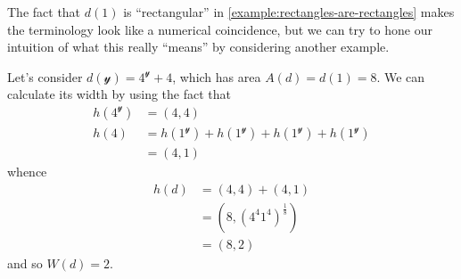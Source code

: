 \documentclass[11pt,fleqn]{article}
\newcommand{\yon}{\mathcal{y}}
\begin{document}
\begin{example}
\label{example:width-and-equal-distribution}
  The fact that $d(1)$ is ``rectangular'' in \cref{example:rectangles-are-rectangles} makes the terminology look like a numerical coincidence, but we can try to hone our intuition of what this really ``means'' by considering another example.

  Let's consider $d(\yon)=4^\yon+4$, which has area $A(d)=d(1)=8$.
  We can calculate its width by using the fact that
  \[
    \begin{aligned}
      h(4^\yon)
      &= (4,4)
    \\h(4)
      &= h(1^\yon) + h(1^\yon) + h(1^\yon) + h(1^\yon)
    \\&= (4,1)
    \end{aligned}
  \]
  whence
  \[
    \begin{aligned}
      h(d)
      &= (4,4) + (4,1)
    \\&= \left(8,(4^4 1^4)^{\frac{1}{8}}\right)
    \\&= (8,2)
    \end{aligned}
  \]
  and so $W(d) = 2$.

  \medskip


\end{example}
\end{document}
